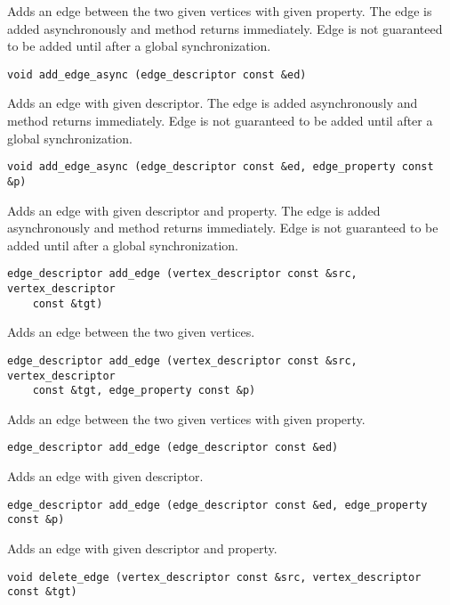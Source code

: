 Adds an edge between the two given vertices with given property. The edge is added asynchronously and method returns immediately. Edge is not guaranteed to be added until after a global synchronization.

\begin{verbatim}
void add_edge_async (edge_descriptor const &ed)
\end{verbatim}

Adds an edge with given descriptor. The edge is added asynchronously and method returns immediately. Edge is not guaranteed to be added until after a global synchronization.

\begin{verbatim}
void add_edge_async (edge_descriptor const &ed, edge_property const &p)
\end{verbatim}

Adds an edge with given descriptor and property. The edge is added asynchronously and method returns immediately. Edge is not guaranteed to be added until after a global synchronization.

\begin{verbatim}
edge_descriptor add_edge (vertex_descriptor const &src, vertex_descriptor
    const &tgt)
\end{verbatim}

Adds an edge between the two given vertices.

\begin{verbatim}
edge_descriptor add_edge (vertex_descriptor const &src, vertex_descriptor
    const &tgt, edge_property const &p)
\end{verbatim}

Adds an edge between the two given vertices with given property.

\begin{verbatim}
edge_descriptor add_edge (edge_descriptor const &ed)
\end{verbatim}

Adds an edge with given descriptor.

\begin{verbatim}
edge_descriptor add_edge (edge_descriptor const &ed, edge_property const &p)
\end{verbatim}

Adds an edge with given descriptor and property.

\begin{verbatim}
void delete_edge (vertex_descriptor const &src, vertex_descriptor const &tgt)
\end{verbatim}

